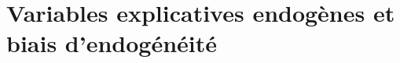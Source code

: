 \begin{frame}
\titlepage
\end{frame}
\begin{frame}
 \tableofcontents
    \end{frame}


\section{Variables explicatives endogènes et biais d'endogénéité}
\frame{\sectionpage}

